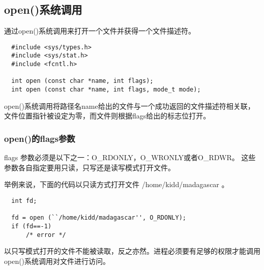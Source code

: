 \subsection{open()系统调用}
通过open()系统调用来打开一个文件并获得一个文件描述符。 
\begin{lstlisting}
  #include <sys/types.h>
  #include <sys/stat.h>
  #include <fcntl.h>

  int open (const char *name, int flags);
  int open (const char *name, int flags, mode_t mode);
\end{lstlisting}
open()系统调用将路径名name给出的文件与一个成功返回的文件描述符相关联，文件位置指针被设定为零，而文件则根据flags给出的标志位打开。
\subsubsection{open()的flags参数}
flags 参数必须是以下之一：O\_RDONLY，O\_WRONLY或者O\_RDWR。 这些参数各自指定要用只读，只写还是读写模式打开文件。

举例来说，下面的代码以只读方式打开文件 /home/kidd/madagascar 。 
\begin{lstlisting}
  int fd;

  fd = open (``/home/kidd/madagascar'', O_RDONLY);
  if (fd==-1)
      /* error */
\end{lstlisting}
以只写模式打开的文件不能被读取，反之亦然。进程必须要有足够的权限才能调用open()系统调用对文件进行访问。


